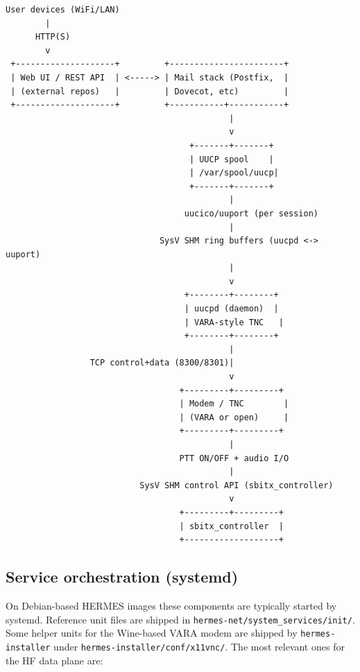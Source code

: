 \begin{verbatim}
User devices (WiFi/LAN)
        |
      HTTP(S)
        v
 +--------------------+         +-----------------------+
 | Web UI / REST API  | <-----> | Mail stack (Postfix,  |
 | (external repos)   |         | Dovecot, etc)         |
 +--------------------+         +-----------+-----------+
                                             |
                                             v
                                     +-------+-------+
                                     | UUCP spool    |
                                     | /var/spool/uucp|
                                     +-------+-------+
                                             |
                                    uucico/uuport (per session)
                                             |
                               SysV SHM ring buffers (uucpd <-> uuport)
                                             |
                                             v
                                    +--------+--------+
                                    | uucpd (daemon)  |
                                    | VARA-style TNC   |
                                    +--------+--------+
                                             |
                 TCP control+data (8300/8301)|
                                             v
                                   +---------+---------+
                                   | Modem / TNC        |
                                   | (VARA or open)     |
                                   +---------+---------+
                                             |
                                   PTT ON/OFF + audio I/O
                                             |
                           SysV SHM control API (sbitx_controller)
                                             v
                                   +---------+---------+
                                   | sbitx_controller  |
                                   +-------------------+
\end{verbatim}

\subsection{Service orchestration (systemd)}

On Debian-based HERMES images these components are typically started by systemd. Reference unit files are shipped in
\verb|hermes-net/system_services/init/|. Some helper units for the Wine-based VARA modem are shipped by \verb|hermes-installer| under
\verb|hermes-installer/conf/x11vnc/|. The most relevant ones for the HF data plane are:


